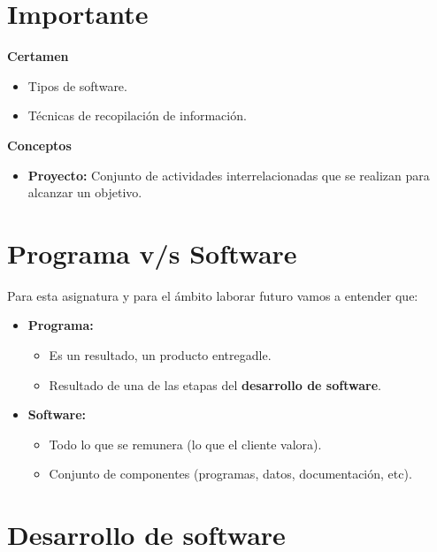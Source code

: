 \documentclass{templateNote}
\begin{document}


\portada
\margenes 
\tableofcontents
\newpage

\section{Importante}

\textbf{Certamen}
\begin{itemize}
    \item Tipos de software.
    \item Técnicas de recopilación de información.
\end{itemize}

\textbf{Conceptos}
\begin{itemize}
    \item \textbf{Proyecto:} Conjunto de actividades interrelacionadas que se realizan para alcanzar un objetivo.
\end{itemize}

\newpage
\section{Programa v/s Software}
Para esta asignatura y para el ámbito laborar futuro vamos a entender que:
\begin{itemize}
    \item \textbf{Programa:} 
    \begin{itemize}
        \item Es un resultado, un producto entregadle.
        \item Resultado de una de las etapas del \textbf{desarrollo de software}.
    \end{itemize}
    \item \textbf{Software:}
    \begin{itemize}
        \item Todo lo que se remunera (lo que el cliente valora).
        \item Conjunto de componentes (programas, datos, documentación, etc).
    \end{itemize}
\end{itemize}

\section{Desarrollo de software}
\end{document}
